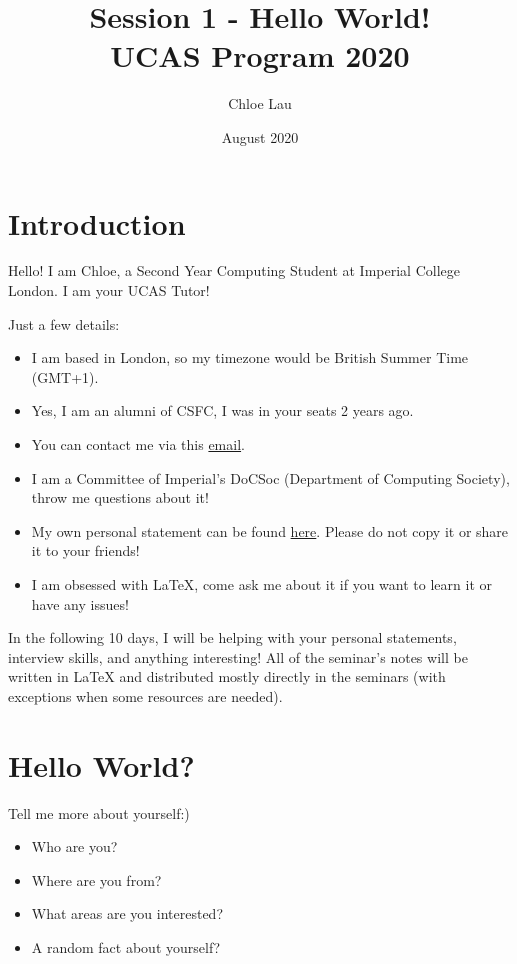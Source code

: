 \documentclass[12pt]{article}
\title{\vspace{-2cm} \textbf{Session 1 - Hello World!} \\ UCAS Program 2020}
\author{Chloe Lau}
\date{August 2020}
\begin{document}
\setlength{\parindent}{4ex}
\setlength{\parskip}{1em}

\maketitle

\section{Introduction}
Hello! I am Chloe, a Second Year Computing Student at Imperial College London. I am your UCAS Tutor!

Just a few details:
\begin{itemize}
    \item I am based in London, so my timezone would be British Summer Time (GMT+1).
    \item Yes, I am an alumni of CSFC, I was in your seats 2 years ago.
    \item You can contact me via this \href{mailto:ucastutor19@ccoex.com}{email}.
    \item I am a Committee of Imperial's DoCSoc (Department of Computing Society), throw me questions about it!
    \item My own personal statement can be found  \href{https://drive.google.com/file/d/1TmUbngo7RldUyzRq49FYU50ye2DMcl5a/view?usp=sharing}{here}. Please do not copy it or share it to your friends!
    \item I am obsessed with \LaTeX{}, come ask me about it if you want to learn it or have any issues!
\end{itemize}

In the following 10 days, I will be helping with your personal statements, interview skills, and anything interesting! All of the seminar's notes will be written in \LaTeX{} and distributed mostly directly in the seminars (with exceptions when some resources are needed).

\section{Hello World?}
Tell me more about yourself:)
\begin{itemize}
    \item Who are you?
    \item Where are you from?
    \item What areas are you interested?
    \item A random fact about yourself?
\end{itemize}
\end{document}
